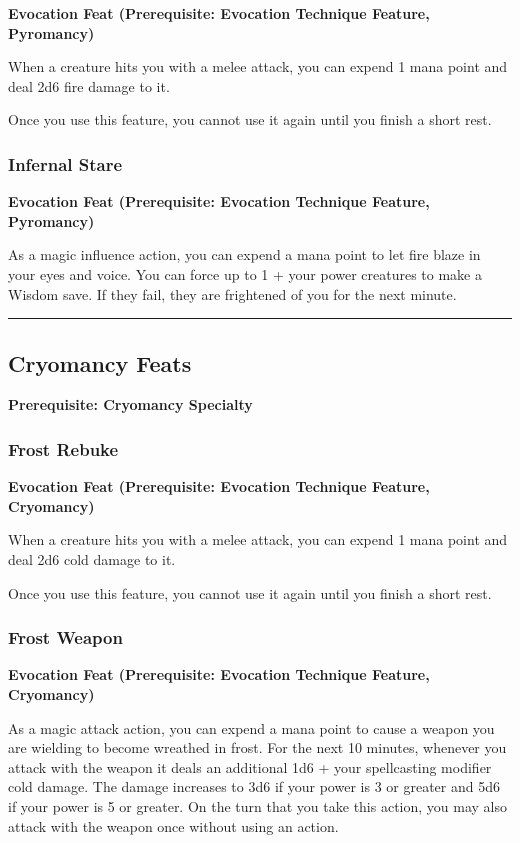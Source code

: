 \documentclass[12pt,letterpaper,twocolumn,openany,nodeprecatedcode,bg=none]{dndbook}
\begin{document}
\textbf{Evocation Feat (Prerequisite: Evocation Technique Feature,
Pyromancy)}

When a creature hits you with a melee attack, you can expend 1 mana
point and deal 2d6 fire damage to it.

Once you use this feature, you cannot use it again until you finish a
short rest.

\subsubsection{Infernal Stare}\label{infernal-stare}

\textbf{Evocation Feat (Prerequisite: Evocation Technique Feature,
Pyromancy)}

As a magic influence action, you can expend a mana point to let fire
blaze in your eyes and voice. You can force up to 1 + your power
creatures to make a Wisdom save. If they fail, they are frightened of
you for the next minute.

\begin{center}\rule{0.5\linewidth}{0.5pt}\end{center}

\subsection{Cryomancy Feats}\label{cryomancy-feats}

\textbf{Prerequisite: Cryomancy Specialty}

\subsubsection{Frost Rebuke}\label{frost-rebuke}

\textbf{Evocation Feat (Prerequisite: Evocation Technique Feature,
Cryomancy)}

When a creature hits you with a melee attack, you can expend 1 mana
point and deal 2d6 cold damage to it.

Once you use this feature, you cannot use it again until you finish a
short rest.

\subsubsection{Frost Weapon}\label{frost-weapon}

\textbf{Evocation Feat (Prerequisite: Evocation Technique Feature,
Cryomancy)}

As a magic attack action, you can expend a mana point to cause a weapon
you are wielding to become wreathed in frost. For the next 10 minutes,
whenever you attack with the weapon it deals an additional 1d6 + your
spellcasting modifier cold damage. The damage increases to 3d6 if your
power is 3 or greater and 5d6 if your power is 5 or greater. On the turn
that you take this action, you may also attack with the weapon once
without using an action.
\end{document}

